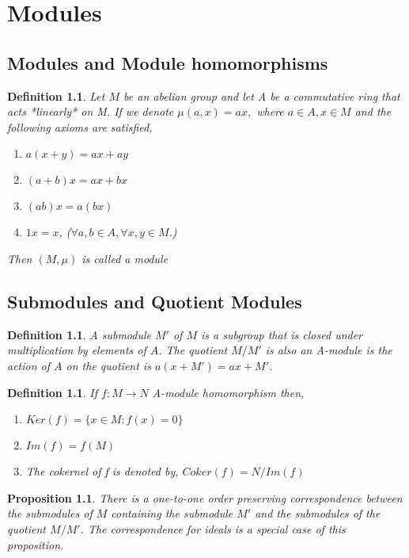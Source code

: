 \documentclass[]{report}
\newtheorem{prop}[theorem]{Proposition}
\newtheorem{defn}[theorem]{Definition}
\begin{document}

\chapter{Modules}

\section{Modules and Module homomorphisms}

\begin{defn}
    Let $M$ be an abelian group and let A be a commutative ring that acts *linearly* on M. If we denote $\mu(a,x) = ax,$ where $a\in A, x \in M$ and the following axioms are satisfied,
    \begin{enumerate}
        \item $a(x+y) = ax + ay$
        \item $(a+b)x = ax + bx$
        \item $(ab)x = a(bx)$
        \item $1x = x$, 
 ($\forall a,b \in A, \forall x,y \in M$.)
    \end{enumerate}
 
Then $(M,\mu)$ is called a module
\end{defn}

\section{Submodules and Quotient Modules}

\begin{defn}
    A submodule $M'$ of $M$ is a subgroup that is closed under multiplication by elements of $A$. The quotient $M/M'$ is also an A-module is the action of $A$ on the quotient is $a(x + M') = ax + M'$.
\end{defn}

\begin{defn}
    If $f:M \rightarrow N$ A-module homomorphism then,
    \begin{enumerate}
        \item $Ker(f) = \{x \in M: f(x) = 0\}$
        \item $Im(f) = f(M)$
        \item The cokernel of f is denoted by, $Coker(f) = N/Im(f)$
    \end{enumerate}
\end{defn}

\begin{prop}
    There is a one-to-one order preserving correspondence between the submodules of $M$ containing the submodule $M'$ and the submodules of the quotient $M/M'$. The correspondence for ideals is a special case of this proposition. 
\end{prop}
\end{document}
